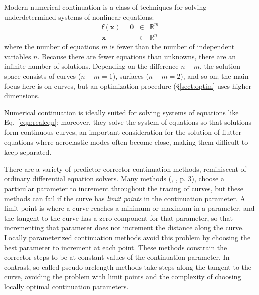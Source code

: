\documentclass[11pt,openany,twoside]{book}
\numberwithin{equation}{section}		%
\newcommand{\Newterm}[1]{{\em #1}}	%
\newcommand{\Vector}[1]{\boldsymbol{#1}}
\newcommand{\Sectref}[1]{\S\ref{#1}}
\newcommand{\Eqn}[1]{Eq.\ \ref{#1}}  %
\begin{document}
Modern numerical continuation is a class of techniques for solving
underdetermined systems of nonlinear equations:
\begin{eqnarray}\label{eqn:fx}
\Vector{f}(\Vector{x}) = \Vector{0} & \in & \mathbb{R}^{m} \nonumber \\
\Vector{x} & \in & \mathbb{R}^{n}
\end{eqnarray}
where the number of equations $m$
is fewer than the number of independent variables $n$.
Because there are fewer equations than unknowns, there are an infinite
number of solutions.
Depending on the difference $n-m$, the solution space consists of
curves ($n-m = 1$), surfaces ($n-m = 2$), and so on; the main focus here
is on curves, but an optimization procedure (\Sectref{sect:optim}
uses higher dimensions.
\par
Numerical continuation is ideally suited for solving systems of equations
like \Eqn{eqn:realeqn}; moreover, they solve the system of equations
so that solutions form continuous curves,
an important consideration for the solution of flutter equations
where aeroelastic modes often become close, making them difficult to
keep separated.
\par
There are a variety of predictor-corrector continuation methods, 
reminiscent of ordinary differential equation solvers.
Many methods
(\cite{cardani1978continuation}, \cite{yu2020nonlinear},
\cite{allgower1990numerical} p. 3),
choose a particular parameter to increment throughout the tracing of curves,
but these methods can fail if the curve has \Newterm{limit points} in
the continuation parameter.
A limit point is where a curve reaches a minimum or maximum in a parameter,
and the tangent to the curve has a zero component for that parameter,
so that incrementing that parameter does not increment the distance along the
curve.
Locally parameterized continuation methods \cite{rheinboldt1983locally}
avoid this problem
by choosing the best parameter to increment at each point.
These methods constrain the corrector steps to be at constant values of the
continuation parameter.
In contrast, so-called pseudo-arclength methods take steps along the tangent
to the curve, avoiding the problem with limit points and the complexity of
choosing locally optimal continuation parameters.
\end{document}
